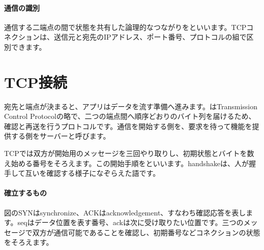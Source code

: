 \paragraph{通信の識別}
        通信する二端点の間で状態を共有した論理的なつながりをといいます。TCPコネクションは、送信元と宛先のIPアドレス、ポート番号、プロトコルの組で区別できます。

\par
\endgroup
  \vspace{0mm}
\par
\endgroup


\section{TCP接続}
\label{sec:05-network-10}

宛先と端点が決まると、アプリはデータを流す準備へ進みます。はTransmission Control Protocolの略で、二つの端点間へ順序どおりのバイト列を届けるため、確認と再送を行うプロトコルです。通信を開始する側を、要求を待って機能を提供する側をサーバーと呼びます。

TCPでは双方が開始用のメッセージを三回やり取りし、初期状態とバイトを数え始める番号をそろえます。この開始手順をといいます。handshakeは、人が握手して互いを確認する様子になぞらえた語です。

\begingroup
\begingroup
      \centering
\par
\endgroup
\medskip
\begingroup
\paragraph{確立するもの}
        図のSYNはsynchronize、ACKはacknowledgement、すなわち確認応答を表します。seqはデータ位置を表す番号、ackは次に受け取りたい位置です。三つのメッセージで双方が通信可能であることを確認し、初期番号などコネクションの状態をそろえます。

